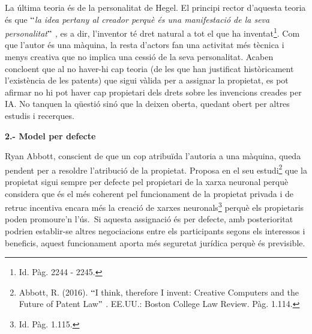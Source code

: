 \documentclass[12pt]{article}
\begin{document}
\vspace{\baselineskip}
\begin{justify}
La última teoria és de la personalitat de Hegel. El principi rector d’aquesta teoria és que \textit{$``$la idea pertany al creador perquè és una manifestació de la seva personalitat$"$ , }es a dir, l’inventor té dret natural a tot el que ha inventat\footnote{ Id. Pàg. 2244 - 2245. }. Com que l’autor és una màquina, la resta d’actors fan una activitat més tècnica i menys creativa que no implica una cessió de la seva personalitat.  Acaben concloent que al no haver-hi cap teoria (de les que han justificat històricament l’existència de les patents) que sigui vàlida per a assignar la propietat, es pot afirmar no hi pot haver cap propietari dels drets sobre les invencions creades per IA. No tanquen la qüestió sinó que la deixen oberta, quedant obert per altres estudis i recerques. 
\end{justify}\par


\vspace{\baselineskip}
\begin{justify}
\textbf{2.- Model per defecte}
\end{justify}\par


\vspace{\baselineskip}
\begin{justify}
Ryan Abbott, conscient de que un cop atribuïda l’autoria a una màquina, queda pendent per a resoldre l’atribució de la propietat. Proposa en el seu estudi\footnote{ Abbott, R. (2016). $``$I think, therefore I invent: Creative Computers and the Future of Patent Law$"$ . EE.UU.: Boston College Law Review. Pàg. 1.114. } que la propietat sigui sempre per defecte pel propietari de la xarxa neuronal perquè considera que és el més coherent pel funcionament de la propietat privada i de retruc incentiva encara més la creació de xarxes neuronals\footnote{ Id. Pàg. 1.115. } perquè els propietaris poden promoure’n l’ús.\  Si aquesta assignació és per defecte, amb posterioritat podrien establir-se altres negociacions entre els participants segons els interessos i beneficis, aquest funcionament aporta més seguretat jurídica perquè és previsible.
\end{justify}\par
\end{document}
